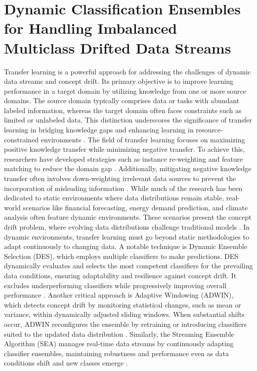 \chapter{Dynamic Classification Ensembles for Handling Imbalanced
Multiclass Drifted Data Streams}
\label{chapter:6_transfer_learning}
Transfer learning is a powerful approach for addressing the challenges of dynamic data streams and concept drift. Its primary objective is to improve learning performance in a target domain by utilizing knowledge from one or more source domains. The source domain typically comprises data or tasks with abundant labeled information, whereas the target domain often faces constraints such as limited or unlabeled data. This distinction underscores the significance of transfer learning in bridging knowledge gaps and enhancing learning in resource-constrained environments \cite{pan2009survey, wang2019characterizing}.  
The field of transfer learning focuses on maximizing positive knowledge transfer while minimizing negative transfer. To achieve this, researchers have developed strategies such as instance re-weighting and feature matching to reduce the domain gap \cite{zadrozny2004learning, cortes2008sample, pan2010domain, sun2016return}. Additionally, mitigating negative knowledge transfer often involves down-weighting irrelevant data sources to prevent the incorporation of misleading information \cite{wang2019characterizing}. While much of the research has been dedicated to static environments where data distributions remain stable, real-world scenarios like financial forecasting, energy demand prediction, and climate analysis often feature dynamic environments. These scenarios present the concept drift problem, where evolving data distributions challenge traditional models \cite{li2015learning, cao2019learning}.  
In dynamic environments, transfer learning must go beyond static methodologies to adapt continuously to changing data. A notable technique is Dynamic Ensemble Selection (DES), which employs multiple classifiers to make predictions. DES dynamically evaluates and selects the most competent classifiers for the prevailing data conditions, ensuring adaptability and resilience against concept drift. It excludes underperforming classifiers while progressively improving overall performance \cite{cruz2017meta, jackowski2014improved, kuncheva2000clustering}.  
Another critical approach is Adaptive Windowing (ADWIN), which detects concept drift by monitoring statistical changes, such as mean or variance, within dynamically adjusted sliding windows. When substantial shifts occur, ADWIN reconfigures the ensemble by retraining or introducing classifiers suited to the updated data distribution \cite{madkour2023historical}. Similarly, the Streaming Ensemble Algorithm (SEA) manages real-time data streams by continuously adapting classifier ensembles, maintaining robustness and performance even as data conditions shift and new classes emerge \cite{gama2004learning, adams2023explainable, madkour2023historical}.  
